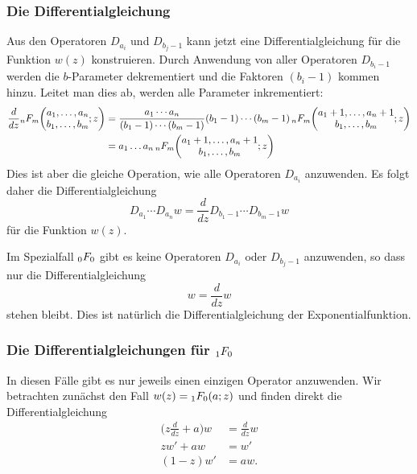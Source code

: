 \subsubsection{Die Differentialgleichung}
Aus den Operatoren $D_{a_i}$ und $D_{b_j-1}$ kann jetzt eine
Differentialgleichung für die Funktion $w(z)$ konstruieren.
Durch Anwendung von aller Operatoren $D_{b_i-1}$ werden die
$b$-Parameter dekrementiert und die Faktoren $(b_i-1)$ kommen hinzu.
Leitet man dies ab, werden alle Parameter inkrementiert:
\begin{align*}
\frac{d}{dz}
\mathstrut_nF_m\biggl(
\begin{matrix}a_1,\dots,a_n\\
b_1,\dots,b_m\end{matrix};z
\biggr)
&=
\frac{a_1\cdots a_n}{(b_1-1)\cdots(b_m-1)}
(b_1-1)\cdots(b_m-1)
\,\mathstrut_nF_m\biggl(
\begin{matrix}a_1+1,\dots,a_n+1\\
b_1,\dots,b_m\end{matrix};z
\biggr)
\\
&=
a_1\dots a_n
\,\mathstrut_nF_m\biggl(
\begin{matrix}a_1+1,\dots,a_n+1\\
b_1,\dots,b_m\end{matrix};z
\biggr)
\end{align*}
Dies ist aber die gleiche Operation, wie alle Operatoren $D_{a_i}$ 
anzuwenden.
Es folgt daher die Differentialgleichung 
\[
D_{a_1}\cdots D_{a_n} w = \frac{d}{dz} D_{b_1-1}\cdots D_{b_m-1} w
\]
für die Funktion $w(z)$.

\begin{beispiel}
Im Spezialfall $\mathstrut_0F_0$ gibt es keine Operatoren $D_{a_i}$
oder $D_{b_j-1}$ anzuwenden, so dass nur die Differentialgleichung
\[
w=\frac{d}{dz}w
\]
stehen bleibt.
Dies ist natürlich die Differentialgleichung der Exponentialfunktion.
\end{beispiel}

%
%
\subsubsection{Die Differentialgleichungen für $\mathstrut_1F_0$}
In diesen Fälle gibt es nur jeweils einen einzigen Operator
anzuwenden.
Wir betrachten zunächst den Fall $w(z) = \mathstrut_1F_0(a; z)$
und finden direkt die Differentialgleichung
\begin{align*}
\biggl(z\frac{d}{dz}+a\biggr)w
&=
\frac{d}{dz}w
\\
zw'+a w
&=
w'
\\
(1-z)w'
&=
a w.
\end{align*}

